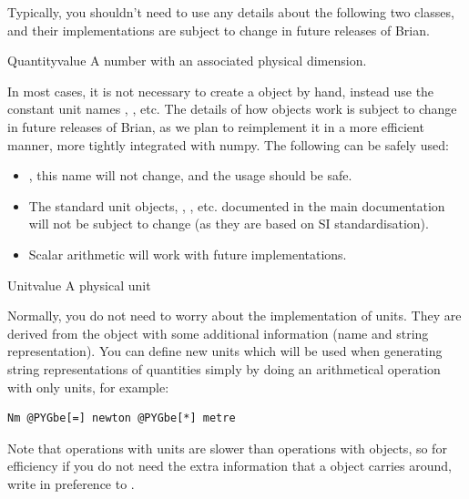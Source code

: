 \documentclass[letterpaper,10pt,english]{manual}
\begin{document}
Typically, you shouldn't need to use any details about the following
two classes, and their implementations are subject to change in
future releases of Brian.

\hypertarget{brian.Quantity}{}\begin{classdesc}{Quantity}{value}
A number with an associated physical dimension.

In most cases, it is not necessary to create a \hyperlink{brian.Quantity}{} object
by hand, instead use the constant unit names , ,
etc. The details of how \hyperlink{brian.Quantity}{} objects work is subject to
change in future releases of Brian, as we plan to reimplement it
in a more efficient manner, more tightly integrated with numpy. The
following can be safely used:
\begin{itemize}
\item {} 
\hyperlink{brian.Quantity}{}, this name will not change, and the usage
 should be safe.

\item {} 
The standard unit objects, , , etc.
documented in the main documentation will not be subject
to change (as they are based on SI standardisation).

\item {} 
Scalar arithmetic will work with future implementations.

\end{itemize}
\end{classdesc}

\hypertarget{brian.Unit}{}\begin{classdesc}{Unit}{value}
A physical unit

Normally, you do not need to worry about the implementation of
units. They are derived from the \hyperlink{brian.Quantity}{} object with
some additional information (name and string representation).
You can define new units which will be used when generating
string representations of quantities simply by doing an
arithmetical operation with only units, for example:

\begin{Verbatim}[commandchars=@\[\]]
Nm @PYGbe[=] newton @PYGbe[*] metre
\end{Verbatim}

Note that operations with units are slower than operations with
\hyperlink{brian.Quantity}{} objects, so for efficiency if you do not need the
extra information that a \hyperlink{brian.Unit}{} object carries around, write
 in preference to .
\end{classdesc}
\resetcurrentobjects
{}
\end{document}
